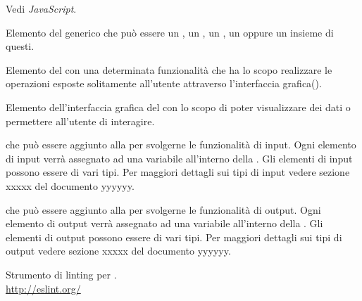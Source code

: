 Vedi \textit{JavaScript}.

Elemento del  generico che può essere un , un , un , un  oppure un insieme di questi.

Elemento del  con una determinata funzionalità che ha lo scopo realizzare le operazioni esposte solitamente all’utente attraverso l’interfaccia grafica().

Elemento dell’interfaccia grafica del  con lo scopo di poter visualizzare dei dati o permettere all’utente di interagire.

 che può essere aggiunto alla  per svolgerne le funzionalit\`a di input. Ogni elemento di input verr\`a assegnato ad una variabile all’interno della . Gli elementi di input possono essere di vari tipi. Per maggiori dettagli sui tipi di input vedere sezione xxxxx del documento yyyyyy.

 che può essere aggiunto alla  per svolgerne le funzionalit\`a di output. Ogni elemento di output verr\`a assegnato ad una variabile all’interno della . Gli elementi di output possono essere di vari tipi. Per maggiori dettagli sui tipi di output vedere sezione xxxxx del documento yyyyyy.

Strumento di linting per .\\
\url{http://eslint.org/}
\clearpage